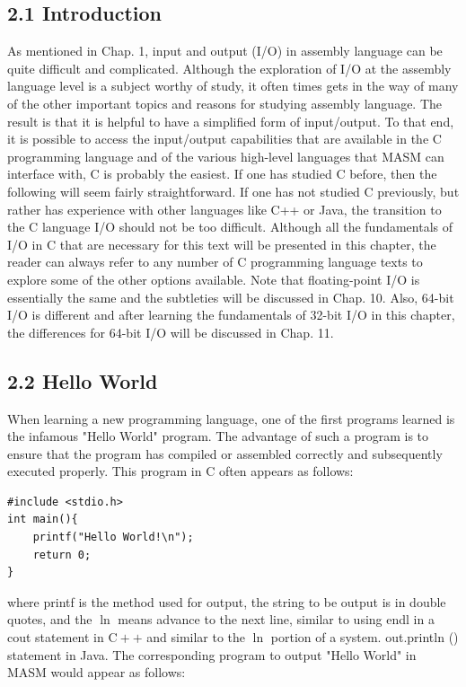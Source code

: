 \documentclass[10pt]{book}
\begin{document}
\subsection*{2.1 Introduction}
As mentioned in Chap. 1, input and output (I/O) in assembly language can be quite difficult and complicated. Although the exploration of I/O at the assembly language level is a subject worthy of study, it often times gets in the way of many of the other important topics and reasons for studying assembly language. The result is that it is helpful to have a simplified form of input/output. To that end, it is possible to access the input/output capabilities that are available in the C programming language and of the various high-level languages that MASM can interface with, C is probably the easiest. If one has studied C before, then the following will seem fairly straightforward. If one has not studied C previously, but rather has experience with other languages like C++ or Java, the transition to the C language I/O should not be too difficult. Although all the fundamentals of I/O in C that are necessary for this text will be presented in this chapter, the reader can always refer to any number of C programming language texts to explore some of the other options available. Note that floating-point I/O is essentially the same and the subtleties will be discussed in Chap. 10. Also, 64-bit I/O is different and after learning the fundamentals of 32-bit I/O in this chapter, the differences for 64-bit I/O will be discussed in Chap. 11.

\subsection*{2.2 Hello World}
When learning a new programming language, one of the first programs learned is the infamous "Hello World" program. The advantage of such a program is to ensure that the program has compiled or assembled correctly and subsequently executed properly. This program in C often appears as follows:

\begin{verbatim}
#include <stdio.h>
int main(){
    printf("Hello World!\n");
    return 0;
}
\end{verbatim}

where printf is the method used for output, the string to be output is in double quotes, and the $\ln$ means advance to the next line, similar to using endl in a cout statement in $\mathrm{C}++$ and similar to the $\ln$ portion of a system. out.println () statement in Java. The corresponding program to output "Hello World" in MASM would appear as follows:
\end{document}
